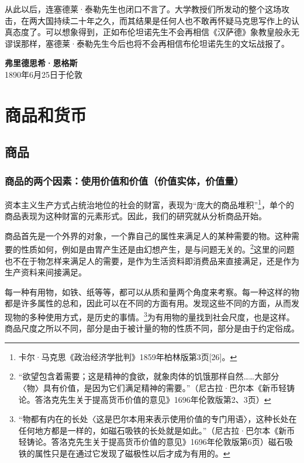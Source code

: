\documentclass{ctexbook}
\begin{document}
从此以后，连塞德莱·泰勒先生也闭口不言了。大学教授们所发动的整个这场攻击，在两大国持续二十年之久，而其结果是任何人也不敢再怀疑马克思写作上的认真态度了。可以想象得到，正如布伦坦诺先生不会再相信《汉萨德》象教皇般永无谬误那样，塞德莱·泰勒先生今后也将不会再相信布伦坦诺先生的文坛战报了。



\begin{flushright}
    \textbf{弗里德思希·恩格斯}\\
    \small{1890年6月25日于伦敦}
\end{flushright}







\mainmatter

\part{商品和货币}
\thispagestyle{empty}

\chapter{商品}

    \section{商品的两个因素：使用价值和价值（价值实体，价值量）}

    资本主义生产方式占统治地位的社会的财富，表现为“庞大的商品堆积”\footnote{卡尔·马克思《政治经济学批判》1859年柏林版第3页[26]。}，单个的商品表现为这种财富的元素形式。因此，我们的研究就从分析商品开始。

    商品首先是一个外界的对象，一个靠自己的属性来满足人的某种需要的物。这种需要的性质如何，例如是由胃产生还是由幻想产生，是与问题无关的。\footnote{“欲望包含着需要；这是精神的食欲，就象肉体的饥饿那样自然……大部分〈物〉具有价值，是因为它们满足精神的需要。”（尼古拉·巴尔本《新币轻铸论。答洛克先生关于提高货币价值的意见》1696年伦敦版第2、3页）}这里的问题也不在于物怎样来满足人的需要，是作为生活资料即消费品来直接满足，还是作为生产资料来间接满足。

    每一种有用物，如铁、纸等等，都可以从质和量两个角度来考察。每一种这样的物都是许多属性的总和，因此可以在不同的方面有用。发现这些不同的方面，从而发现物的多种使用方式，是历史的事情。\footnote{“物都有内在的长处〈这是巴尔本用来表示使用价值的专门用语〉，这种长处在任何地方都是一样的，如磁石吸铁的长处就是如此。”（尼古拉·巴尔本《新币轻铸论。答洛克先生关于提高货币价值的意见》1696年伦敦版第6页）磁石吸铁的属性只是在通过它发现了磁极性以后才成为有用的。}为有用物的量找到社会尺度，也是这样。商品尺度之所以不同，部分是由于被计量的物的性质不同，部分是由于约定俗成。
\end{document}
